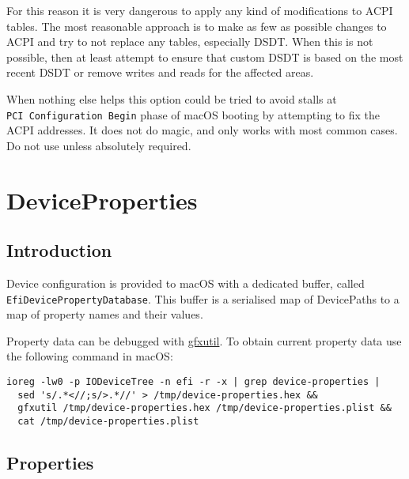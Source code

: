 \documentclass[]{article}
\begin{document}
\begin{enumerate}
  For this reason it is very dangerous to apply any kind of
  modifications to ACPI tables. The most reasonable approach is to make
  as few as possible changes to ACPI and try to not replace any tables,
  especially DSDT. When this is not possible, then at least attempt to
  ensure that custom DSDT is based on the most recent DSDT or remove
  writes and reads for the affected areas.

  When nothing else helps this option could be tried to avoid stalls at
  \texttt{PCI\ Configuration\ Begin} phase of macOS booting by
  attempting to fix the ACPI addresses. It does not do magic, and only
  works with most common cases. Do not use unless absolutely required.

\end{enumerate}


\section{DeviceProperties}\label{devprops}

\subsection{Introduction}\label{devpropsintro}

Device configuration is provided to macOS with a dedicated buffer,
called \texttt{EfiDevicePropertyDatabase}. This buffer is a serialised
map of DevicePaths to a map of property names and their values.

Property data can be debugged with
\href{https://github.com/acidanthera/gfxutil}{gfxutil}.
To obtain current property data use the following command in macOS:
\begin{lstlisting}[label=gfxutil, style=ocbash]
ioreg -lw0 -p IODeviceTree -n efi -r -x | grep device-properties |
  sed 's/.*<//;s/>.*//' > /tmp/device-properties.hex &&
  gfxutil /tmp/device-properties.hex /tmp/device-properties.plist &&
  cat /tmp/device-properties.plist
\end{lstlisting}

\subsection{Properties}\label{devpropsprops}
\end{document}
